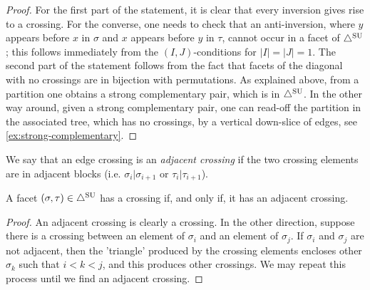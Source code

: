 \begin{proof}
For the first part of the statement, it is clear that every inversion gives rise to a crossing. 
For the converse, one needs to check that an anti-inversion, where $y$ appears before $x$ in $\sigma$ and $x$ appears before $y$ in $\tau$, cannot occur in a facet of $\triangle^{\mathrm{SU}}$; this follows immediately from the $(I,J)$-conditions for $|I|=|J|=1$. 
The second part of the statement follows from the fact that facets of the diagonal with no crossings are in bijection with permutations.
As explained above, from a partition one obtains a strong complementary pair, which is in $\triangle^{\mathrm{SU}}$. 
In the other way around, given a strong complementary pair, one can read-off the partition in the associated tree, which has no crossings, by a vertical down-slice of edges, see \cref{ex:strong-complementary}.
\end{proof}
We say that an edge crossing is an \emph{adjacent crossing} if the two crossing elements are in adjacent blocks (i.e. $\sigma_i|\sigma_{i+1}$ or $\tau_i|\tau_{i+1}$).
\begin{lemma}
A facet $(\sigma,\tau) \in \triangle^{\mathrm{SU}}$ has a crossing if, and only if, it has an adjacent crossing.
\end{lemma}
\begin{proof}
An adjacent crossing is clearly a crossing. In the other direction, suppose there is a crossing between an element of $\sigma_i$ and an element of $\sigma_j$. If $\sigma_i$ and $\sigma_j$ are not adjacent, then the 'triangle' produced by the crossing elements encloses other $\sigma_k$ such that $i<k<j$, and this produces other crossings. We may repeat this process until we find an adjacent crossing.
\end{proof}

